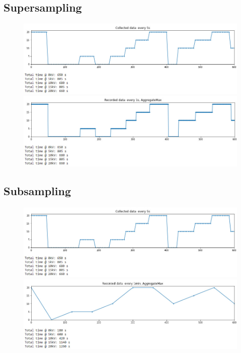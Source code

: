 \documentclass[t, 9pt, aspectratio=169]{beamer}
\begin{document}
    \subsection{Supersampling}

    \begin{frame}{\secname}{\subsecname}
        \vspace{-0.5cm}
        \begin{figure}
            \includegraphics[scale=0.5]{collected-data-5s.jpg}
            \includegraphics[scale=0.5]{aggregate-max-1s.jpg}
        \end{figure}
    \end{frame}

    \subsection{Subsampling}

    \begin{frame}{\secname}{\subsecname}
        \vspace{-0.5cm}
        \begin{figure}
            \includegraphics[scale=0.5]{collected-data-5s.jpg}
            \includegraphics[scale=0.5]{aggregate-max-1min.jpg}
        \end{figure}
    \end{frame}
\end{document}
